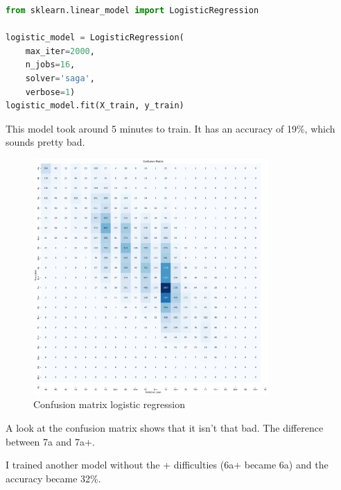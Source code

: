 \documentclass{article}
\begin{document}
\begin{lstlisting}[language=python, caption={Simple logistic regression}]
from sklearn.linear_model import LogisticRegression

logistic_model = LogisticRegression(
    max_iter=2000, 
    n_jobs=16,
    solver='saga',
    verbose=1)  
logistic_model.fit(X_train, y_train)
\end{lstlisting}

This model took around 5 minutes to train. It has an accuracy of 19\%, which sounds pretty bad.

\begin{figure}[H]
    \centering    
    \includegraphics[width=0.8\textwidth]{../Models/LogisticRegression/confusion_matrix.pdf}
    \caption{Confusion matrix logistic regression}\label{fig:conf_logreg}
\end{figure}

A look at the confusion matrix shows that it isn't that bad. The difference between 7a and 7a+.

I trained another model without the + difficulties (6a+ became 6a) and the accuracy became 32\%. 
\end{document}
